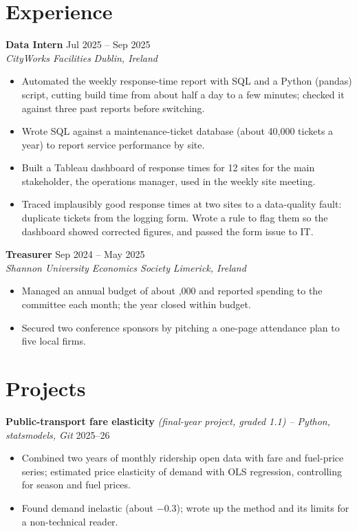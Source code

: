 \documentclass[11pt,a4paper]{article}
\newcommand{\entry}[4]{\textbf{#1} \hfill #2\\ \textit{#3} \hfill \textit{#4}\par}
\begin{document}
\section{Experience}
\entry{Data Intern}{Jul 2025 -- Sep 2025}{CityWorks Facilities}{Dublin, Ireland}
\begin{itemize}
  \item Automated the weekly response-time report with SQL and a Python (pandas) script, cutting build time from about half a day to a few minutes; checked it against three past reports before switching.
  \item Wrote SQL against a maintenance-ticket database (about 40,000 tickets a year) to report service performance by site.
  \item Built a Tableau dashboard of response times for 12 sites for the main stakeholder, the operations manager, used in the weekly site meeting.
  \item Traced implausibly good response times at two sites to a data-quality fault: duplicate tickets from the logging form. Wrote a rule to flag them so the dashboard showed corrected figures, and passed the form issue to IT.
\end{itemize}

\vspace{4pt}
\entry{Treasurer}{Sep 2024 -- May 2025}{Shannon University Economics Society}{Limerick, Ireland}
\begin{itemize}
  \item Managed an annual budget of about ,000 and reported spending to the committee each month; the year closed within budget.
  \item Secured two conference sponsors by pitching a one-page attendance plan to five local firms.
\end{itemize}

\section{Projects}
\textbf{Public-transport fare elasticity} \textit{(final-year project, graded 1.1) -- Python, statsmodels, Git} \hfill 2025--26
\begin{itemize}
  \item Combined two years of monthly ridership open data with fare and fuel-price series; estimated price elasticity of demand with OLS regression, controlling for season and fuel prices.
  \item Found demand inelastic (about $-0.3$); wrote up the method and its limits for a non-technical reader.
\end{itemize}
\end{document}
